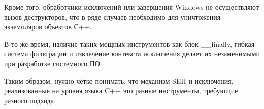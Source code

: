 \documentclass[a4paper,12pt]{article} %
\begin{document}
\vspace{2em}
Кроме того, обработчики исключений или завершения Windows не осуществляют вызов деструкторов, что в ряде случаев необходимо для уничтожения экземпляров объектов С++.

\vspace{2em}
В то же время, наличие таких мощных инструментов как блок \_\_finally, гибкая система фильтрации и извлечение контекста исключения делает их незаменимыми при разработке системного ПО.

\vspace{2em}
Таким образом, нужно чётко понимать, что механизм SEH и исключения, реализованные на уровня языка C++ это разные инструменты, требующие разного подхода.
\end{document}

